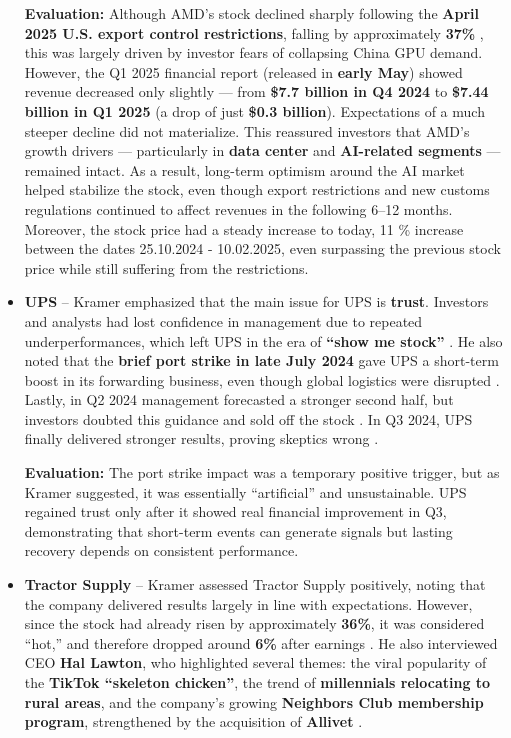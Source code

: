 \documentclass[12pt,a4paper]{article}
\begin{document}
\begin{itemize}
\textbf{Evaluation:} Although AMD’s stock declined sharply following the \textbf{April 2025 U.S. export control restrictions}, 
falling by approximately \textbf{37\%} \cite{AMD}, this was largely driven by investor fears of collapsing China GPU demand. 
However, the Q1 2025 financial report (released in \textbf{early May}) showed revenue decreased only slightly --- from 
\textbf{\$7.7 billion in Q4 2024}\cite{amdQ42024} to \textbf{\$7.44 billion in Q1 2025} \cite{amdQ1} (a drop of just \textbf{\$0.3 billion}). 
Expectations of a much steeper decline did not materialize. This reassured investors that AMD’s growth drivers --- particularly in \textbf{data center} and \textbf{AI-related segments} --- 
remained intact. As a result, long-term optimism around the AI market helped stabilize the stock, 
even though export restrictions and new customs regulations continued to affect revenues in the following 6--12 months. Moreover, the stock price had a steady increase to today, 11 \% increase between the dates 25.10.2024 - 10.02.2025, even surpassing the previous stock price while still suffering from the restrictions.\cite{AMD}
\newpage


    \item \textbf{UPS} -- Kramer emphasized that the main issue for UPS is \textbf{trust}. 
    Investors and analysts had lost confidence in management due to repeated underperformances, which left UPS in the era of \textbf{“show me stock”} \cite{cnbc}. 
    He also noted that the \textbf{brief port strike in late July 2024} gave UPS a short-term boost in its forwarding business, 
    even though global logistics were disrupted \cite{reutersUPS}. 
    Lastly, in Q2 2024 management forecasted a stronger second half, but investors doubted this guidance and sold off the stock \cite{UPS}. 
    In Q3 2024, UPS finally delivered stronger results, proving skeptics wrong \cite{UPS}. 
\vspace{0.3cm}

    \textbf{Evaluation:} The port strike impact was a temporary positive trigger, but as Kramer suggested, 
    it was essentially “artificial” and unsustainable. 
    UPS regained trust only after it showed real financial improvement in Q3, 
    demonstrating that short-term events can generate signals but lasting recovery depends on consistent performance.
\vspace{0.7cm}


    \item \textbf{Tractor Supply} -- Kramer assessed Tractor Supply positively, 
    noting that the company delivered results largely in line with expectations. 
    However, since the stock had already risen by approximately \textbf{36\%}, 
    it was considered “hot,” and therefore dropped around \textbf{6\%} after earnings \cite{cnbc}. 
    He also interviewed CEO \textbf{Hal Lawton}, 
    who highlighted several themes: the viral popularity of the \textbf{TikTok “skeleton chicken”}, 
    the trend of \textbf{millennials relocating to rural areas}, 
    and the company’s growing \textbf{Neighbors Club membership program}, 
    strengthened by the acquisition of \textbf{Allivet} \cite{AllivetPR}.
\vspace{0.3cm}


\end{itemize}
\end{document}

